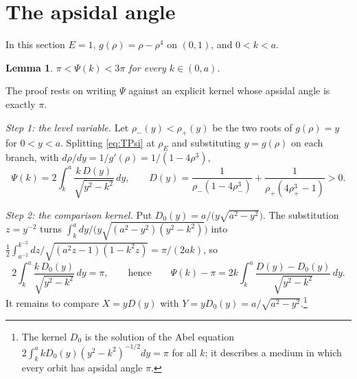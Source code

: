 \documentclass[11pt]{amsart}
\newtheorem{lemma}[theorem]{Lemma}
\theoremstyle{definition}
\theoremstyle{remark}
\begin{document}
\section{The apsidal angle}\label{sec:apsidal}

In this section $E=1$, $g(\rho)=\rho-\rho^4$ on $(0,1)$, and $0<k<a$.

\begin{lemma}\label{lem:apsidal}
$\pi<\Psi(k)<3\pi$ for every $k\in(0,a)$.
\end{lemma}

The proof rests on writing $\Psi$ against an explicit kernel whose apsidal angle is exactly $\pi$.

\emph{Step 1: the level variable.} Let $\rho_-(y)<\rho_+(y)$ be the two roots of $g(\rho)=y$ for $0<y<a$. Splitting \eqref{eq:TPsi} at $\rho_E$ and substituting $y=g(\rho)$ on each branch, with $d\rho/dy=1/g'(\rho)=1/(1-4\rho^3)$,
\begin{equation}\label{eq:PsiD}
\Psi(k)=2\int_k^a\frac{k\,D(y)}{\sqrt{y^2-k^2}}\,dy,\qquad D(y)=\frac{1}{\rho_-(1-4\rho_-^3)}+\frac{1}{\rho_+(4\rho_+^3-1)}>0 .
\end{equation}

\emph{Step 2: the comparison kernel.} Put $D_0(y)=a/\bigl(y\sqrt{a^2-y^2}\bigr)$. The substitution $z=y^{-2}$ turns
$\int_k^a dy/\bigl(y\sqrt{(a^2-y^2)(y^2-k^2)}\bigr)$ into $\frac12\int_{a^{-2}}^{k^{-2}}dz/\sqrt{(a^2z-1)(1-k^2z)}=\pi/(2ak)$, so
\[
2\int_k^a\frac{k\,D_0(y)}{\sqrt{y^2-k^2}}\,dy=\pi,\qquad\text{hence}\qquad
\Psi(k)-\pi=2k\int_k^a\frac{D(y)-D_0(y)}{\sqrt{y^2-k^2}}\,dy .
\]
It remains to compare $X=yD(y)$ with $Y=yD_0(y)=a/\sqrt{a^2-y^2}$.\footnote{The kernel $D_0$ is the solution of the Abel equation $2\int_k^a kD_0(y)(y^2-k^2)^{-1/2}dy=\pi$ for all $k$; it describes a medium in which every orbit has apsidal angle $\pi$.}
\end{document}

